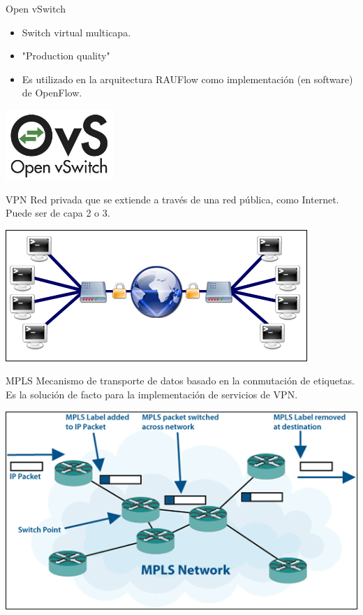 \documentclass[xcolor=svgnames]{beamer}
\begin{document}
\begin{frame}{Open vSwitch}
	\begin{minipage}[b]{0.5\textwidth}
		\begin{itemize}
			\item Switch virtual multicapa.
			\item "Production quality"
			\item Es utilizado en la arquitectura RAUFlow como implementación (en software) de OpenFlow.
		\end{itemize}
	\end{minipage}
	\hfill
	\begin{minipage}[b]{0.4\textwidth}
		\includegraphics[scale=0.7]{openvswitch_logo}
	\end{minipage}
\end{frame}

\begin{frame}{VPN}
	Red privada que se extiende a través de una red pública, como Internet. Puede ser de capa 2 o 3.
	\begin{center}
		\includegraphics[scale=0.8]{vpn}
	\end{center}
\end{frame}

\begin{frame}{MPLS}
	Mecanismo de transporte de datos basado en la conmutación de etiquetas. Es la solución de facto para la implementación de servicios de VPN.
	\begin{center}
		\includegraphics[scale=0.6]{mpls}
	\end{center}
\end{frame}
\end{document}
